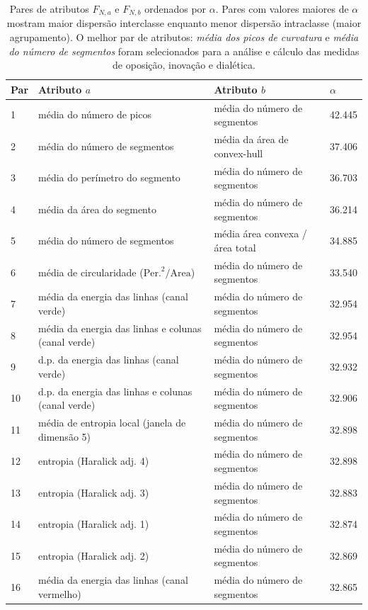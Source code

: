 \begin{table}[ht] \footnotesize
  \begin{center}
  \caption{\label{tab:alpha} Pares de atributos $F_{N, a}$ e $F_{N, b}$
    ordenados por
    $\alpha$. Pares com valores maiores de $\alpha$ mostram maior dispersão
    interclasse enquanto menor dispersão intraclasse (maior agrupamento).
    O melhor par de atributos: \emph{média dos picos de curvatura} e
    \emph{média do número de segmentos} foram selecionados para a análise e
    cálculo das medidas de oposição, inovação e dialética.}
\begin{tabular}{@{}llll}
 \hline \hline
 \textbf{Par} & \textbf{Atributo $a$}    & \textbf{Atributo $b$}   & \textbf{$\alpha$} \\ 
 
 \hline
 
 1 & média do número de picos & média do número de segmentos & 42.445 \\
 2 & média do número de segmentos & média da área de convex-hull & 37.406 \\
 3 & média do perímetro do segmento & média do número de segmentos & 36.703 \\
 4 & média da área do segmento & média do número de segmentos & 36.214 \\
 5 & média do número de segmentos & média área convexa / área total & 34.885 \\
 6 & média de circularidade ($\mathrm{Per.}^2/\mathrm{Area}$) & média do número
 de segmentos & 33.540 \\
 7 & média da energia das linhas (canal verde) & média do número de segmentos & 32.954 \\
 8 & média da energia das linhas e colunas (canal verde) & média do número de segmentos & 32.954 \\
 9 & d.p. da energia das linhas (canal verde) & média do número de segmentos & 32.932 \\
 10 & d.p. da energia das linhas e colunas (canal verde) & média do número
 de segmentos & 32.906 \\
 11 & média de entropia local (janela de dimensão 5) & média do número de segmentos & 32.898 \\
 12 & entropia (Haralick adj. 4) & média do número de segmentos & 32.898 \\
 13 & entropia (Haralick adj. 3) & média do número de segmentos & 32.883 \\
 14 & entropia (Haralick adj. 1) & média do número de segmentos & 32.874 \\
 15 & entropia (Haralick adj. 2) & média do número de segmentos & 32.869 \\
 16 & média da energia das linhas (canal vermelho) & média do número de segmentos & 32.865 \\
\hline \hline
 \end{tabular}
 \fonteminha
\end{center}
\end{table}

